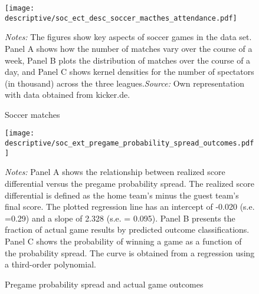 \documentclass[11pt, a4paper]{article} %
\begin{document}
\vspace*{\fill}
\begin{figure}[H]\centering
	\caption{Soccer matches}\label{fig_soc_ext:descriptives_matches_time_attendance}
	\texttt{[image: descriptive/soc\_ect\_desc\_soccer\_macthes\_attendance.pdf]}	
	\begin{minipage}{\linewidth}
		\scriptsize{\emph{Notes:} The figures show key aspects of soccer games in the data set. Panel A shows how the number of matches vary over the course of a week, Panel B plots the distribution of matches over the course of a day, and Panel C shows kernel densities for the number of spectators (in thousand) across the three leagues.\newline \emph{Source:} Own representation with data obtained from kicker.de.}
	\end{minipage}
\end{figure}
\vspace*{\fill}\clearpage


\vspace*{\fill}
\begin{figure}[H]\centering
	\caption{Pregame probability spread and actual game outcomes}\label{fig_soc_ext:pregame_probability_spread_outcomes}
	\texttt{[image: descriptive/soc\_ext\_pregame\_probability\_spread\_outcomes.pdf]}
	\scriptsize
	\begin{minipage}{\linewidth}
		\emph{Notes:} Panel A shows the relationship between realized score differential versus the pregame probability spread. The realized score differential is defined as the home team's minus the guest team's final score. The plotted regression line has an intercept of -0.020 (s.e. =0.29) and a slope of 2.328 (s.e. = 0.095). Panel B presents the fraction of actual game results by predicted outcome classifications. Panel C shows the probability of winning a game as a function of the probability spread. The curve is obtained from a regression using a third-order polynomial.
	\end{minipage}
\end{figure}
\vspace*{\fill}\clearpage
\end{document}
